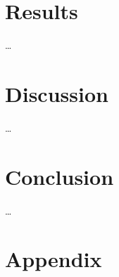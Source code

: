 \documentclass[%
a4paper, 12pt, DIV=calc, BCOR5mm,abstracton]{scrartcl}
\newcounter{SeitenzahlSpeicher}
\begin{document}
\section{Results} \label{sec:Res}
\dots%

\section{Discussion} \label{sec:Disc}
\dots%

\section{Conclusion} \label{sec:Conc}
\dots%

	

\clearpage
{}
\setcounter{page}{\theSeitenzahlSpeicher}
\appendix

\section{Appendix}


	
\newpage
\printbibliography 
%
%
%
%
\end{document}
